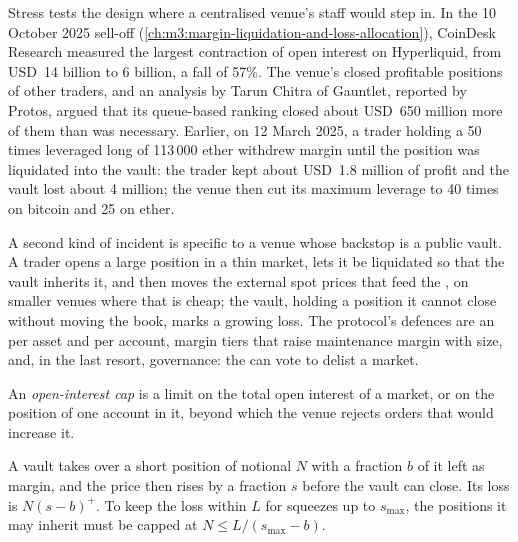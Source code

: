Stress tests the design where a centralised venue's staff would step in. In the 10 October 2025 sell-off
(\cref{ch:m3:margin-liquidation-and-loss-allocation}), CoinDesk Research measured the largest contraction of open interest on Hyperliquid,
from USD~14 billion to 6 billion, a fall of 57\%. The venue's  closed profitable positions of other traders, and an analysis
by Tarun Chitra of Gauntlet, reported by Protos, argued that its queue-based ranking closed about USD~650 million more of them than was
necessary. Earlier, on 12 March 2025, a trader holding a 50 times leveraged long of 113\,000 ether withdrew margin until the position was
liquidated into the vault: the trader kept about USD~1.8 million of profit and the vault lost about 4 million; the venue then cut its
maximum leverage to 40 times on bitcoin and 25 on ether.

A second kind of incident is specific to a venue whose backstop is a public vault. A trader opens a large position in a thin market, lets
it be liquidated so that the vault inherits it, and then moves the external spot prices that feed the , on smaller venues where that is
cheap; the vault, holding a position it cannot close without moving the book, marks a growing loss. The protocol's defences are an
 per asset and per account, margin tiers that raise maintenance margin with size, and, in the last resort, governance: the
 can vote to delist a market.

\begin{definition}\label{def:m3:on-chain-order-books-and-perpetual-dexs:oicap}
An \emph{open-interest cap} is a limit on the total open interest of a market, or on the position of one account in it,
beyond which the venue rejects orders that would increase it.
\end{definition}

\begin{proposition}\label{prop:m3:on-chain-order-books-and-perpetual-dexs:squeeze}
A vault takes over a short position of notional $N$ with a fraction $b$ of it left as margin, and the price then rises by a fraction $s$ before the
vault can close. Its loss is $N(s - b)^+$. To keep the loss within $L$ for squeezes up to $s_{\max}$, the positions it may inherit must be capped at
$N \le L/(s_{\max} - b)$.
\end{proposition}

